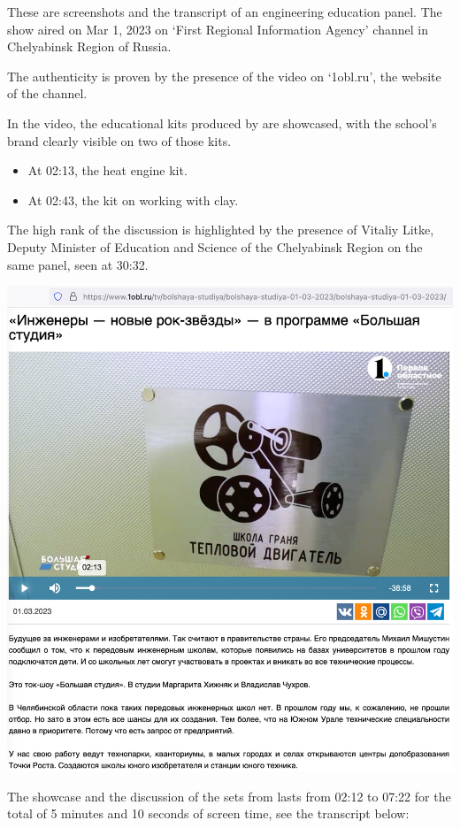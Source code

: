
These are screenshots and the transcript of an engineering education panel.
The show aired on Mar 1, 2023 on `First Regional Information Agency' channel
in Chelyabinsk Region of Russia.

The authenticity is proven by the presence of the video on `1obl.ru', the website of the channel.

In the video, the educational kits produced by \GSchool are showcased,
with the school's brand clearly visible on two of those kits.

\begin{itemize}
    \item At 02:13, the heat engine kit.
    \item At 02:43, the kit on working with clay.
\end{itemize}

The high rank of the discussion is highlighted by the presence
of Vitaliy Litke, Deputy Minister of Education and Science of the Chelyabinsk Region
on the same panel, seen at 30:32.

\includegraphics[width=\textwidth]{bag}






The showcase and the discussion of the sets from \GSchool lasts from
02:12 to 07:22 for the total of 5 minutes and 10 seconds of screen time,
see the transcript below:





\pagebreak
